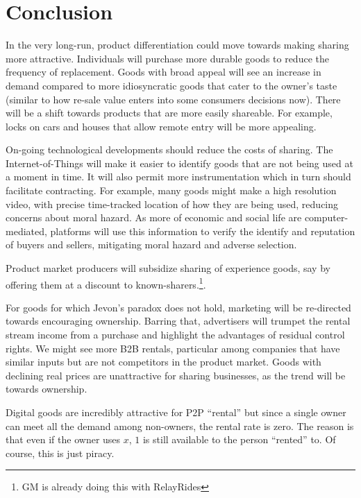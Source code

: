 \documentclass[11pt]{article}
\begin{document}
\section{Conclusion}
In the very long-run, product differentiation could move towards making sharing more attractive. 
Individuals will purchase more durable goods to reduce the frequency of replacement. 
Goods with broad appeal will see an increase in demand compared to more idiosyncratic goods that cater to the owner's taste (similar to how re-sale value enters into some consumers decisions now). 
There will be a shift towards products that are more easily shareable. 
For example, locks on cars and houses that allow remote entry will be more appealing. 

On-going technological developments should reduce the costs of sharing. 
The Internet-of-Things will make it easier to identify goods that are not being used at a moment in time. 
It will also permit more instrumentation which in turn should facilitate contracting. 
For example, many goods might make a high resolution video, with precise time-tracked location of how they are being used, reducing concerns about moral hazard. 
As more of economic and social life are computer-mediated, platforms will use this information to verify the identify and reputation of buyers and sellers, mitigating moral hazard and adverse selection.  

Product market producers will subsidize sharing of experience goods, say by offering them at a discount to known-sharers.\footnote{GM is already doing this with RelayRides}.  

For goods for which Jevon's paradox does not hold, marketing will be re-directed towards encouraging ownership.
Barring that, advertisers will trumpet the rental stream income from a purchase and highlight the advantages of residual control rights. 
We might see more B2B rentals, particular among companies that have similar inputs but are not competitors in the product market. 
Goods with declining real prices are unattractive for sharing businesses, as the trend will be towards ownership. 

Digital goods are incredibly attractive for P2P ``rental'' but since a single owner can meet all the demand among non-owners, the rental rate is zero.
The reason is that even if the owner uses $x$, $1$ is still available to the person ``rented'' to.  
Of course, this is just piracy. 


\cite{sinai2005}
\cite{ikkala2014defining}
\cite{varian2000} 
\cite{byers2013rise} 
\cite{becker1965theory} 



\end{document}
